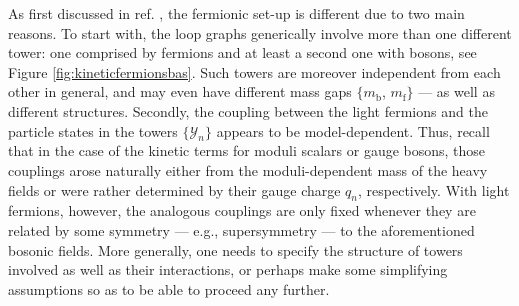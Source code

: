 As first discussed in ref. \cite{Palti:2020tsy}, the fermionic set-up is different due to two main reasons. To start with, the loop graphs generically involve more than one different tower: one comprised by fermions and at least a second one with bosons, see Figure \ref{fig:kineticfermionsbas}. Such towers are moreover independent from each other in general, and may even have different mass gaps $\{ m_{\mathrm{b}}$, $m_{\mathrm{f}}\}$ --- as well as different structures. Secondly, the coupling between the light fermions and the particle states in the towers $\{\mathcal{Y}_n \}$ appears to be model-dependent. Thus, recall that in the case of the kinetic terms for moduli scalars or gauge bosons, those couplings arose naturally either from the moduli-dependent mass of the heavy fields or were rather determined by their gauge charge $q_n$, respectively. With light fermions, however, the analogous couplings are only fixed whenever they are related by some symmetry --- e.g., supersymmetry --- to the aforementioned bosonic fields. More generally, one needs to specify the structure of towers involved as well as their interactions, or perhaps make some simplifying assumptions so as to be able to proceed any further.
	
